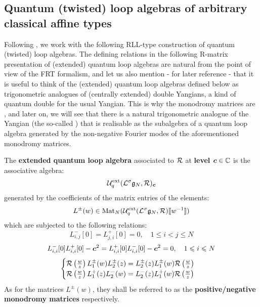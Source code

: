     \subsection{Quantum (twisted) loop algebras of arbitrary classical affine types}
        Following \cite{guay_regelskis_wendlandt_R_matrix_presentation_of_quantum_loop_algebras}, we work with the following RLL-type construction of quantum (twisted) loop algebras. The defining relations in the following R-matrix presentation of (extended) quantum loop algebras are natural from the point of view of the FRT formalism, and let us also mention - for later reference - that it is useful to think of the (extended) quantum loop algebras defined below as trigonometric analogues of (centrally extended) double Yangians, a kind of quantum double for the usual Yangian. This is why the monodromy matrices are , and later on, we will see that there is a natural trigonometric analogue of the Yangian (the so-called ) that is realisable as the subalgebra of a quantum loop algebra generated by the non-negative Fourier modes of the aforementioned monodromy matrices. 
        \begin{definition} \label{def: extended_quantum_loop_algebras_R_matrix_presentation}
            The \textbf{extended quantum loop algebra} associated to $\mathcal{R}$  at \textbf{level $\boldsymbol{c} \in \mathbb{C}$} is the associative algebra:
                $$\mathcal{U}_q^{\mathrm{ext}}(\mathcal{L}^{\sigma}\mathfrak{g}_N, \mathcal{R})_{\boldsymbol{c}}$$
            generated by the coefficients of the matrix entries of the elements:
                $$L^{\pm}(w) \in \operatorname{Mat}_N( \mathcal{U}_q^{\mathrm{ext}}(\mathcal{L}^{\sigma}\mathfrak{g}_N, \mathcal{R})[\![w^{-1}]\!] )$$
            which are subjected to the following relations:
                $$L_{i, j}^-[0] = L_{j, i}^+[0] = 0, \quad 1 \leq i < j \leq N$$
                \begin{equation} \label{equation: undoubling_the_quantum_cartan_subalgebra}
                    L_{i, i}^-[0] L_{i, i}^+[0] - \boldsymbol{c}^2 = L_{i, i}^+[0] L_{i, i}^-[0] - \boldsymbol{c}^2 = 0, \quad 1 \leqslant i \leqslant N
                \end{equation}
                $$
                    \begin{cases}
                        \mathcal{R}\left(\frac{w}{z}\right) L_1^{\pm}(w) L_2^{\pm}(z) = L_2^{\pm}(z) L_1^{\pm}(w) \mathcal{R}\left(\frac{w}{z}\right)
                        \\
                        \mathcal{R}\left(\frac{w}{z}\right) L_1^+(z) L_2^-(w) = L_2^-(z) L_1^+(w) \mathcal{R}\left(\frac{w}{z}\right)
                    \end{cases}
                $$
            As for the matrices $L^{\pm}(w)$, they shall be referred to as the \textbf{positive/negative monodromy matrices} respectively. 
        \end{definition}
